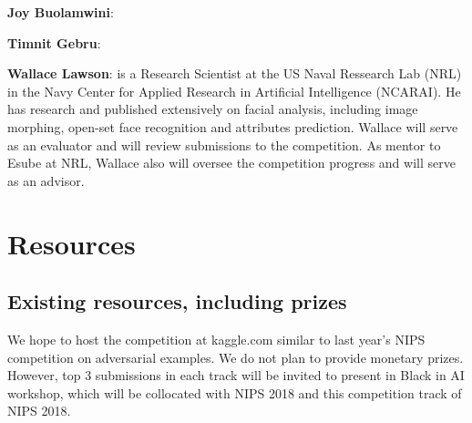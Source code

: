 \documentclass[11pt, oneside]{article}
\begin{document}
{\bf Joy Buolamwini}:

{\bf Timnit Gebru}:

{\bf Wallace Lawson}: is a Research Scientist at the US Naval Ressearch Lab
(NRL) in the Navy Center for Applied Research in Artificial Intelligence
(NCARAI).  He has research and published extensively on facial analysis,
including image morphing, open-set face recognition and attributes prediction.
Wallace will serve as an evaluator and will review submissions to the
competition. As mentor to Esube at NRL, Wallace also will oversee the
competition progress and will serve as an advisor.



\section{Resources}
\subsection{Existing resources, including prizes}

We hope to host the competition at kaggle.com similar to last year's NIPS
competition on adversarial examples. We do not plan to provide monetary prizes.
However, top 3 submissions in each track will be invited to present in Black in
AI workshop, which will be collocated with NIPS 2018 and this competition track
of NIPS 2018.



%

\end{document}

